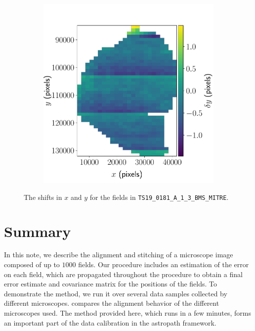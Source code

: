 \documentclass{article}
\begin{document}
\begin{figure}[ht]
\begin{subfigure}{0.49\linewidth}
		\includegraphics[width=\linewidth]{2D-shifts-AKY-y}
		\caption{}
		\label{fig:2DAKYy}
	\end{subfigure}
	\caption{The shifts in  $x$ and  $y$ for the fields in \texttt{TS19\_0181\_A\_1\_3\_BMS\_MITRE}.}
	\label{fig:2DAKY}
\end{figure}

\clearpage

\section{Summary}

In this note, we describe the alignment and stitching of a microscope image composed of up to $1000$ fields.  Our procedure includes an estimation of the error on each field, which are propagated throughout the procedure to obtain a final error estimate and covariance matrix for the positions of the fields.  To demonstrate the method, we run it over several data samples collected by different microscopes.   compares the alignment behavior of the different microscopes used.  The method provided here, which runs in a few minutes, forms an important part of the data calibration in the astropath framework.
\end{document}
